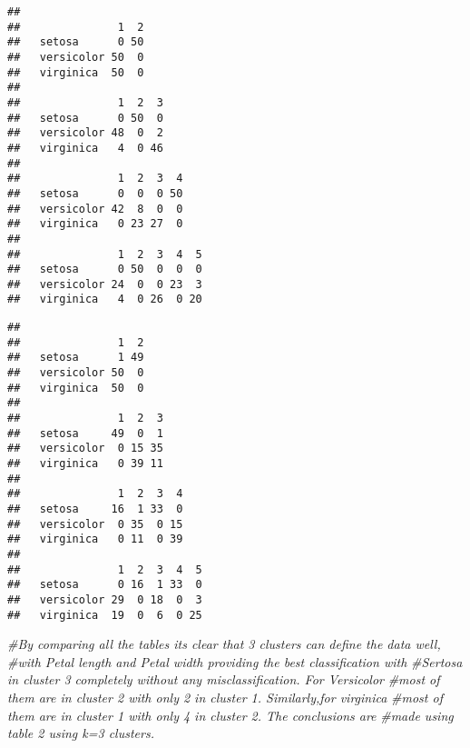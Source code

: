 \documentclass[
]{article}
\newenvironment{Shaded}{\begin{snugshade}}{\end{snugshade}}
\newcommand{\CommentTok}[1]{\textcolor[rgb]{0.56,0.35,0.01}{\textit{#1}}}
\newcommand{\ControlFlowTok}[1]{\textcolor[rgb]{0.13,0.29,0.53}{\textbf{#1}}}
\newcommand{\DataTypeTok}[1]{\textcolor[rgb]{0.13,0.29,0.53}{#1}}
\newcommand{\DecValTok}[1]{\textcolor[rgb]{0.00,0.00,0.81}{#1}}
\newcommand{\KeywordTok}[1]{\textcolor[rgb]{0.13,0.29,0.53}{\textbf{#1}}}
\newcommand{\NormalTok}[1]{#1}
\newcommand{\OperatorTok}[1]{\textcolor[rgb]{0.81,0.36,0.00}{\textbf{#1}}}
\begin{document}
\begin{verbatim}
##             
##               1  2
##   setosa      0 50
##   versicolor 50  0
##   virginica  50  0
##             
##               1  2  3
##   setosa      0 50  0
##   versicolor 48  0  2
##   virginica   4  0 46
##             
##               1  2  3  4
##   setosa      0  0  0 50
##   versicolor 42  8  0  0
##   virginica   0 23 27  0
##             
##               1  2  3  4  5
##   setosa      0 50  0  0  0
##   versicolor 24  0  0 23  3
##   virginica   4  0 26  0 20
\end{verbatim}

\begin{Shaded}
\end{Shaded}

\begin{verbatim}
##             
##               1  2
##   setosa      1 49
##   versicolor 50  0
##   virginica  50  0
##             
##               1  2  3
##   setosa     49  0  1
##   versicolor  0 15 35
##   virginica   0 39 11
##             
##               1  2  3  4
##   setosa     16  1 33  0
##   versicolor  0 35  0 15
##   virginica   0 11  0 39
##             
##               1  2  3  4  5
##   setosa      0 16  1 33  0
##   versicolor 29  0 18  0  3
##   virginica  19  0  6  0 25
\end{verbatim}

\begin{Shaded}
\begin{Highlighting}[]
\CommentTok{#By comparing all the tables its clear that 3 clusters can define the data well, }
\CommentTok{#with Petal length and Petal width providing the best classification with }
\CommentTok{#Sertosa in cluster 3 completely without any misclassification. For Versicolor}
\CommentTok{#most of them are in cluster 2 with only 2 in cluster 1. Similarly,for virginica}
\CommentTok{#most of them are in cluster 1 with only 4 in cluster 2. The conclusions are }
\CommentTok{#made using table 2 using k=3 clusters.}
\end{Highlighting}
\end{Shaded}
\end{document}
